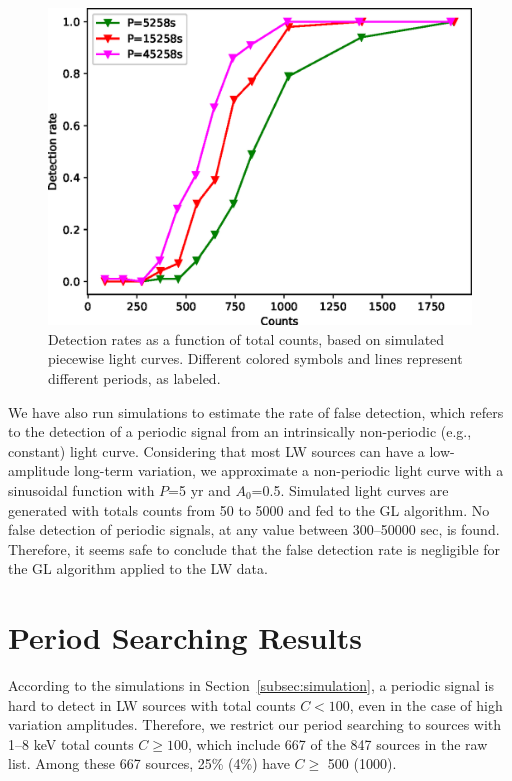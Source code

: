 \documentclass[fleqn,usenatbib]{mnras}
\begin{document}
\begin{figure}
\centering
\includegraphics[scale=0.61]{./figure/sim_LW/eclipse_cut.eps}
\caption{Detection rates as a function of total counts, based on simulated piecewise light curves. Different colored symbols and lines represent different periods, as labeled.}\label{fig:eclipse}
\end{figure}

We have also run simulations to estimate the rate of false detection, which refers to the detection of a periodic signal from an intrinsically non-periodic (e.g., constant) light curve. 
Considering that most LW sources can have a low-amplitude long-term variation, we approximate a non-periodic light curve with a sinusoidal function with $P$=5 yr and $A_0$=0.5. 
Simulated light curves are generated with totals counts from 50 to 5000 and fed to the GL algorithm. No false detection of periodic signals, at any value between 300--50000 sec, is found. 
Therefore, it seems safe to conclude that the false detection rate is negligible for the GL algorithm applied to the LW data. 

\section{Period Searching Results}\label{sec:results}
According to the simulations in Section~\ref{subsec:simulation}, a periodic signal is hard to detect in LW sources with total counts $C<100$, even in the case of high variation amplitudes.  
Therefore, we restrict our period searching to sources with 1--8 keV total counts $C \geq 100$, which include 667 of the 847 sources in the raw list. Among these 667 sources, 25\% (4\%) have $C \geq$ 500 (1000).
\end{document}
